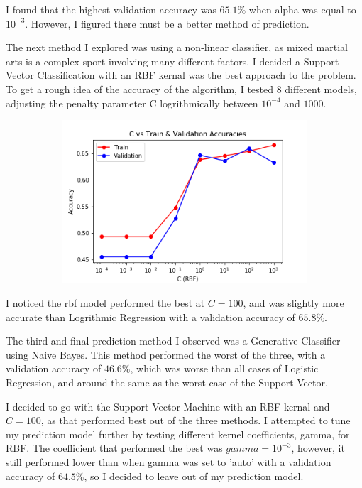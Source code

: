 \documentclass[12pt]{article}
\begin{document}
I found that the highest validation accuracy was $65.1\%$ when alpha was equal to $10^{-3}$. However, I figured there must be a better method of prediction.

The next method I explored was using a non-linear classifier, as mixed martial arts is a complex sport involving many different factors. I decided a Support Vector Classification with an RBF kernal was the best approach to the problem. To get a rough idea of the accuracy of the algorithm, I tested 8 different models, adjusting the penalty parameter C logrithmically between $10^{-4}$ and $1000$.

\begin{figure}[h!]
\centering
\begin{subfigure}{.6\textwidth}
  \centering
  \includegraphics[width=.9\linewidth]{rbf_plot.png}
  \label{fig:sub1}
\end{subfigure}%
\label{fig:test}
\end{figure}

I noticed the rbf model performed the best at $C=100$, and was slightly more accurate than Logrithmic Regression with a validation accuracy of $65.8\%$. 

The third and final prediction method I observed was a Generative Classifier using Naive Bayes. This method performed the worst of the three, with a validation accuracy of $46.6\%$, which was worse than all cases of Logistic Regression, and around the same as the worst case of the Support Vector.

I decided to go with the Support Vector Machine with an RBF kernal and $C=100$, as that performed best out of the three methods. I attempted to tune my prediction model further by testing different kernel coefficients, gamma, for RBF. The coefficient that performed the best was $gamma=10^{-3}$, however, it still performed lower than when gamma was set to 'auto' with a validation accuracy of $64.5\%$, so I decided to leave out of my prediction model.
\end{document}
